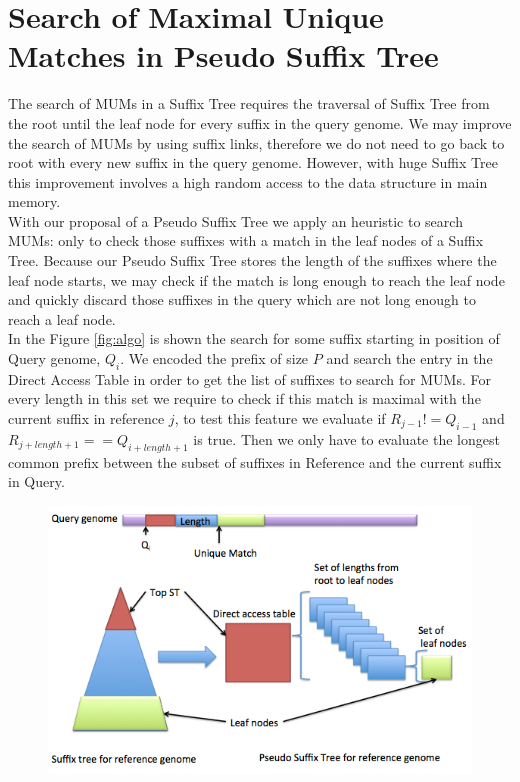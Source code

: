 \documentclass[runningheads,a4paper]{llncs}
\begin{document}
{\section{Search of Maximal Unique Matches in Pseudo Suffix Tree}
The search of MUMs in a Suffix Tree requires the traversal of Suffix Tree from the root until the leaf node for every suffix in the query genome. We may improve the search of MUMs by using suffix links, therefore we do not need to go back to root with every new suffix in the query genome.  However, with huge Suffix Tree this improvement involves a high random access to the data structure in main memory. \\
With our proposal of a Pseudo Suffix Tree we apply an heuristic to search MUMs: only to check those suffixes with a match in the leaf nodes of a Suffix Tree. Because our Pseudo Suffix Tree stores the length of the suffixes where the leaf node starts, we may check if the match is long enough to reach the leaf node and quickly discard those suffixes in the query which are not long enough to reach a leaf node.\\
In the Figure \ref{fig:algo} is shown the search for some suffix starting in position of Query genome, $Q_{i}$. We encoded the prefix of size $P$ and search the entry in the Direct Access Table in order to get the list of suffixes to search for MUMs. For every length in this set we require to check if this match is maximal with the current suffix in reference $j$, to test this feature we evaluate if $R_{j-1}!=Q_{i-1}$ and $R_{j+length+1}==Q_{i+length+1}$ is true. Then we only have to evaluate the longest common prefix between the subset of suffixes in Reference and the current suffix in Query. \\
\begin{figure}
\centering
\includegraphics[scale=0.5]{pseudost-mum.png}

\end{figure}}
\end{document}
